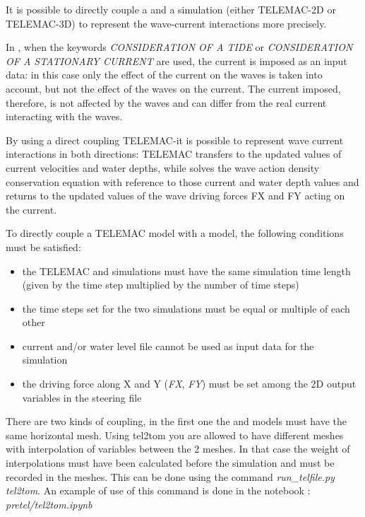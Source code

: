 It is possible to directly couple a \tomawac and a \telemac{} simulation (either TELEMAC-2D or TELEMAC-3D) to represent the wave-current
interactions more precisely.

In \tomawac, when the keywords \textit{CONSIDERATION OF A TIDE} or \textit{CONSIDERATION OF A STATIONARY CURRENT} are used, the current
is imposed as an input data: in this case only the effect of the current on the waves is taken into account, but not the effect of the
waves on the current. The current imposed, therefore, is not affected by the waves and can differ from the real current interacting
with the waves.

By using a direct coupling TELEMAC-\tomawac it is possible to represent wave current interactions in both directions: TELEMAC transfers
to \tomawac the updated values of current velocities and water depths, while \tomawac solves the wave action density conservation
equation with reference to those current and water depth values and returns to \telemac the updated values of the wave driving forces
FX and FY acting on the current.

To directly couple a TELEMAC model with a \tomawac model, the following conditions must be satisfied:

\begin{itemize}

\item  the TELEMAC and \tomawac simulations must have the same simulation time length (given by the time step multiplied by the number
  of time steps)

\item  the time steps set for the two simulations must be equal or multiple of each other

\item  current and/or water level file cannot be used as input data for the \tomawac simulation

\item  the driving force along X and Y (\textit{FX}, \textit{FY}) must be set among the 2D output variables in the steering file
\end{itemize}

There are two kinds of coupling, in the first one the \telemac{} and \tomawac models must have the same horizontal mesh. Using tel2tom
you are allowed to have different meshes with interpolation of variables between the 2 meshes. In that case the weight of
interpolations must have been calculated before the simulation and must be recorded in the meshes. This can be done using the command
{\it run\_telfile.py tel2tom}. An example of use of this command is done in the notebook : {\it pretel/tel2tom.ipynb}

